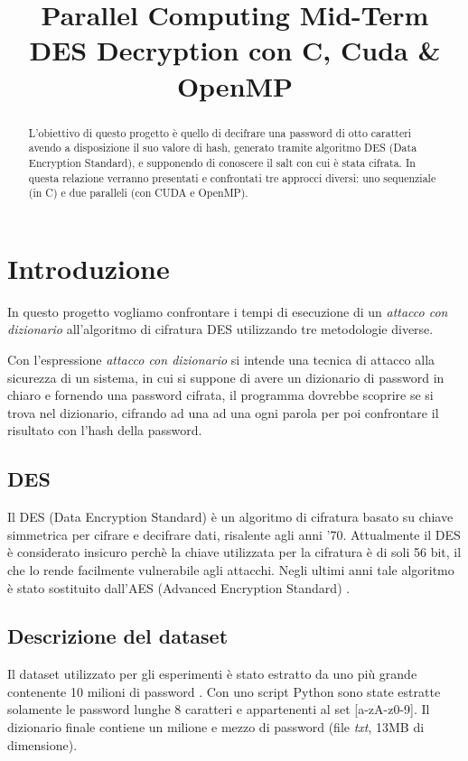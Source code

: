 \documentclass[10pt,twocolumn,letterpaper]{article}
\begin{document}
\title{Parallel Computing Mid-Term\\DES Decryption con C, Cuda \& OpenMP}

\maketitle
\thispagestyle{empty}

\begin{abstract}
   L'obiettivo di questo progetto è quello di decifrare una password di otto caratteri avendo a disposizione il suo valore di hash, generato tramite algoritmo DES (Data Encryption Standard), e supponendo di conoscere il salt con cui è stata cifrata. In questa relazione verranno presentati e confrontati tre approcci diversi: uno sequenziale (in C) e due paralleli (con CUDA e OpenMP).
\end{abstract}

\section{Introduzione}
In questo progetto vogliamo confrontare i tempi di esecuzione di un \textit{attacco con dizionario} all'algoritmo di cifratura DES utilizzando tre metodologie diverse.

Con l'espressione \textit{attacco con dizionario} si intende una tecnica di attacco alla sicurezza di un sistema, in cui si suppone di avere un dizionario di password in chiaro e fornendo una password cifrata, il programma dovrebbe scoprire se si trova nel dizionario, cifrando ad una ad una ogni parola per poi confrontare il risultato con l'hash della password.

\subsection{DES}
Il DES (Data Encryption Standard) è un algoritmo di cifratura basato su chiave simmetrica per cifrare e decifrare dati, risalente agli anni '70. Attualmente il DES è considerato insicuro perchè la chiave utilizzata per la cifratura è di soli 56 bit, il che lo rende facilmente vulnerabile agli attacchi. Negli ultimi anni tale algoritmo è stato sostituito dall'AES (Advanced Encryption Standard) \cite{DES}. 

\subsection{Descrizione del dataset}
Il dataset utilizzato per gli esperimenti è stato estratto da uno più grande contenente 10 milioni di password \cite{DATASET}. Con uno script Python sono state estratte solamente le password lunghe 8 caratteri e appartenenti al set [a-zA-z0-9]. Il dizionario finale contiene un milione e mezzo di password (file \textit{txt}, 13MB di dimensione).
\end{document}
